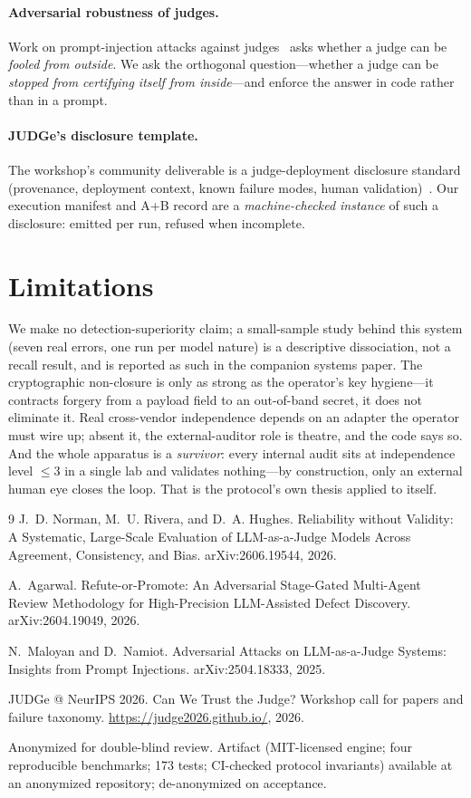 \documentclass{article}
\begin{document}
\paragraph{Adversarial robustness of judges.} Work on prompt-injection attacks against
judges~\cite{maloyan2025adversarial} asks whether a judge can be \emph{fooled from outside}. We ask the
orthogonal question---whether a judge can be \emph{stopped from certifying itself from inside}---and
enforce the answer in code rather than in a prompt.

\paragraph{JUDGe's disclosure template.} The workshop's community deliverable is a judge-deployment
disclosure standard (provenance, deployment context, known failure modes, human
validation)~\cite{judge2026}. Our execution manifest and A+B record are a \emph{machine-checked instance}
of such a disclosure: emitted per run, refused when incomplete.

\section{Limitations}
We make no detection-superiority claim; a small-sample study behind this system (seven real errors, one
run per model nature) is a descriptive dissociation, not a recall result, and is reported as such in the
companion systems paper. The cryptographic non-closure is only as strong as the operator's key
hygiene---it contracts forgery from a payload field to an out-of-band secret, it does not eliminate it.
Real cross-vendor independence depends on an adapter the operator must wire up; absent it, the
external-auditor role is theatre, and the code says so. And the whole apparatus is a \emph{survivor}:
every internal audit sits at independence level $\leq 3$ in a single lab and validates nothing---by
construction, only an external human eye closes the loop. That is the protocol's own thesis applied to
itself.

\begin{thebibliography}{9}
J.~D. Norman, M.~U. Rivera, and D.~A. Hughes.
\newblock Reliability without Validity: A Systematic, Large-Scale Evaluation of LLM-as-a-Judge Models
Across Agreement, Consistency, and Bias.
\newblock arXiv:2606.19544, 2026.

A.~Agarwal.
\newblock Refute-or-Promote: An Adversarial Stage-Gated Multi-Agent Review Methodology for
High-Precision LLM-Assisted Defect Discovery.
\newblock arXiv:2604.19049, 2026.

N.~Maloyan and D.~Namiot.
\newblock Adversarial Attacks on LLM-as-a-Judge Systems: Insights from Prompt Injections.
\newblock arXiv:2504.18333, 2025.

JUDGe @ NeurIPS 2026.
\newblock Can We Trust the Judge? Workshop call for papers and failure taxonomy.
\newblock \url{https://judge2026.github.io/}, 2026.
\end{thebibliography}

\vfill
\begin{center}\footnotesize
Anonymized for double-blind review. Artifact (MIT-licensed engine; four reproducible benchmarks; 173
tests; CI-checked protocol invariants) available at an anonymized repository; de-anonymized on
acceptance.
\end{center}
\end{document}
